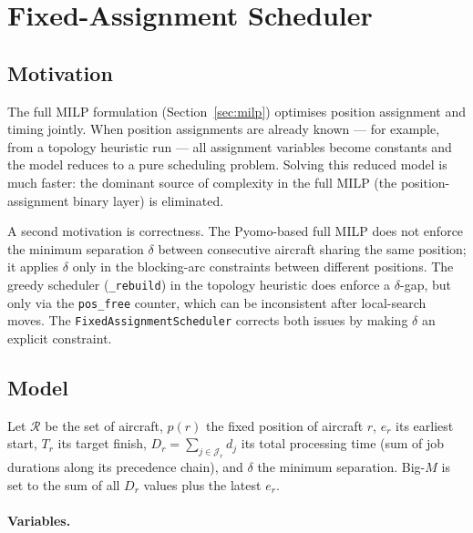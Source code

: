 \section{Fixed-Assignment Scheduler}
\label{sec:fas}

\subsection{Motivation}

The full MILP formulation (Section~\ref{sec:milp}) optimises position
assignment and timing jointly.  When position assignments are already known
— for example, from a topology heuristic run — all assignment variables
become constants and the model reduces to a pure scheduling problem.
Solving this reduced model is much faster: the dominant source of complexity
in the full MILP (the position-assignment binary layer) is eliminated.

A second motivation is correctness.  The Pyomo-based full MILP does not
enforce the minimum separation $\delta$ between consecutive aircraft sharing
the same position; it applies $\delta$ only in the blocking-arc constraints
between different positions.  The greedy scheduler (\texttt{\_rebuild}) in
the topology heuristic does enforce a $\delta$-gap, but only via the
\texttt{pos\_free} counter, which can be inconsistent after local-search
moves.  The \texttt{FixedAssignmentScheduler} corrects both issues by
making $\delta$ an explicit constraint.

\subsection{Model}
\label{sec:fas-model}

Let $\mathcal{R}$ be the set of aircraft, $p(r)$ the fixed position of
aircraft $r$, $e_r$ its earliest start, $T_r$ its target finish,
$D_r = \sum_{j \in \mathcal{J}_r} d_j$ its total processing time (sum of
job durations along its precedence chain), and $\delta$ the minimum
separation.  Big-$M$ is set to the sum of all $D_r$ values plus the latest
$e_r$.

\paragraph{Variables.}

